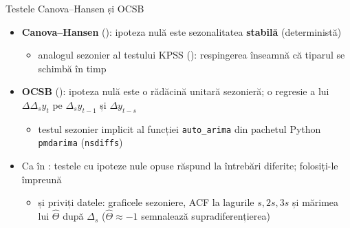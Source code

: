 \begin{frame}{Testele Canova--Hansen și OCSB}
\itemsize{\small}
\begin{itemize}
    \item \textbf{Canova--Hansen} (): ipoteza nulă este sezonalitatea \textbf{stabilă} (deterministă)
    \begin{itemize}
        \item analogul sezonier al testului KPSS (): respingerea înseamnă că tiparul se schimbă în timp
    \end{itemize}
    \item \textbf{OCSB} (): ipoteza nulă este o rădăcină unitară sezonieră; o regresie a lui $\Delta\Delta_s y_t$ pe $\Delta_s y_{t-1}$ și $\Delta y_{t-s}$
    \begin{itemize}
        \item testul sezonier implicit al funcției \texttt{auto\_arima} din pachetul Python \texttt{pmdarima} (\texttt{nsdiffs})
    \end{itemize}
    \item Ca în : testele cu ipoteze nule opuse răspund la întrebări diferite; folosiți-le împreună
    \begin{itemize}
        \item și priviți datele: graficele sezoniere, ACF la lagurile $s, 2s, 3s$ și mărimea lui $\hat\Theta$ după $\Delta_s$ ($\hat\Theta \approx -1$ semnalează supradiferențierea)
    \end{itemize}
\end{itemize}
\end{frame}

